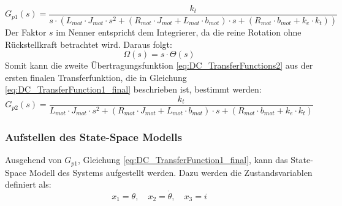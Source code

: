 \begin{equation}
    \label{eq:DC_TransferFunction1_final}
    G_{p1}(s) = \frac{k_t}{s \cdot (L_{mot} \cdot J_{mot} \cdot s^2 + (R_{mot} \cdot J_{mot} + L_{mot} \cdot b_{mot}) \cdot s + (R_{mot} \cdot b_{mot} + k_e \cdot k_t))}
\end{equation}
\newline
Der Faktor $s$ im Nenner entspricht dem Integrierer, da die reine Rotation ohne Rückstellkraft betrachtet wird.
Daraus folgt:
\begin{equation}
    \label{eq:DC_TransferFunction_step}
    \Omega(s) = s\cdot\Theta(s)
\end{equation}
\newline
Somit kann die zweite Übertragungsfunktion \ref{eq:DC_TransferFunctions2} aus der ersten finalen Transferfunktion, die in Gleichung \ref{eq:DC_TransferFunction1_final} beschrieben ist, bestimmt werden:
\begin{equation}
    \label{eq:DC_TransferFunction2_final}
    G_{p2}(s) = \frac{k_t}{L_{mot} \cdot J_{mot} \cdot s^2 + (R_{mot} \cdot J_{mot} + L_{mot} \cdot b_{mot}) \cdot s + (R_{mot} \cdot b_{mot} + k_e \cdot k_t)}
\end{equation}


\subsubsection{Aufstellen des State-Space Modells}
Ausgehend von $G_{p1}$, Gleichung \ref{eq:DC_TransferFunction1_final}, kann das State-Space Modell des Systems aufgestellt werden. Dazu werden die Zustandsvariablen definiert als:
\begin{equation}
    \label{eq:DC_StateVariables}
    x_1 = \theta, \quad x_2 = \dot{\theta}, \quad x_3 = i
\end{equation}

